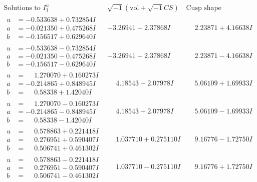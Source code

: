 \documentclass[1p]{elsarticle_modified}
\theoremstyle{definition}
\newcommand{\I}{\sqrt{-1}}
\begin{document}
$$\begin{array}{c|c|c}  
\text{Solutions to }I^u_{1}& \I (\text{vol} + \sqrt{-1}CS) & \text{Cusp shape}\\
 \hline 
\begin{aligned}
u &= -0.533638 + 0.732854 I \\
a &= -0.021350 + 0.475268 I \\
b &= -0.156517 + 0.629640 I\end{aligned}
 & -3.26941 - 2.37868 I & \phantom{-}2.23871 + 4.16638 I \\ \hline\begin{aligned}
u &= -0.533638 - 0.732854 I \\
a &= -0.021350 - 0.475268 I \\
b &= -0.156517 - 0.629640 I\end{aligned}
 & -3.26941 + 2.37868 I & \phantom{-}2.23871 - 4.16638 I \\ \hline\begin{aligned}
u &= \phantom{-}1.270070 + 0.160273 I \\
a &= -0.214865 + 0.848945 I \\
b &= \phantom{-}0.58338 + 1.42040 I\end{aligned}
 & \phantom{-}4.18543 - 2.07978 I & \phantom{-}5.06109 + 1.69933 I \\ \hline\begin{aligned}
u &= \phantom{-}1.270070 - 0.160273 I \\
a &= -0.214865 - 0.848945 I \\
b &= \phantom{-}0.58338 - 1.42040 I\end{aligned}
 & \phantom{-}4.18543 + 2.07978 I & \phantom{-}5.06109 - 1.69933 I \\ \hline\begin{aligned}
u &= \phantom{-}0.578863 + 0.221418 I \\
a &= \phantom{-}0.276951 + 0.590407 I \\
b &= \phantom{-}0.506741 + 0.461302 I\end{aligned}
 & \phantom{-}1.037710 + 0.275110 I & \phantom{-}9.16776 - 1.72750 I \\ \hline\begin{aligned}
u &= \phantom{-}0.578863 - 0.221418 I \\
a &= \phantom{-}0.276951 - 0.590407 I \\
b &= \phantom{-}0.506741 - 0.461302 I\end{aligned}
 & \phantom{-}1.037710 - 0.275110 I & \phantom{-}9.16776 + 1.72750 I \\ \hline\begin{aligned}

\end{aligned}
\end{array}$$
\end{document}
